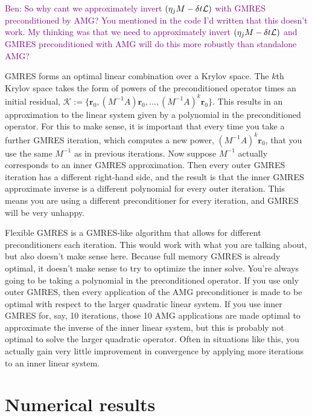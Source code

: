 \documentclass[review]{siamart}
\newcommand{\tcp}{\textcolor{purple}}
\begin{document}
\tcp{Ben: So why cant we approximately invert $(\eta_j M - \delta t {\cal L})$ with GMRES preconditioned by AMG? You mentioned in the code I'd written that this doesn't work. My thinking was that we need to approximately invert $(\eta_j M - \delta t {\cal L})$ and GMRES preconditioned with AMG will do this more robustly than standalone AMG?}
{\color{blue}
GMRES forms an optimal linear combination over a Krylov space. The $k$th Krylov space takes the form of powers
of the preconditioned operator times an initial residual, $\mathcal{K} := \{\mathbf{r}_0, (M^{-1}A)\mathbf{r}_0, 
..., (M^{-1}A)^k\mathbf{r}_0\}$. This results in an approximation to the linear system given by a polynomial
in the preconditioned operator. For this to make sense, it is important that every time you take a further
GMRES iteration, which computes a new power, $(M^{-1}A)^k\mathbf{r}_0$, that you use the same $M^{-1}$ as in
previous iterations. Now suppose $M^{-1}$ actually corresponds to an inner GMRES approximation. Then every
outer GMRES iteration has a different right-hand side, and the result is that the inner GMRES approximate 
inverse is a different polynomial for every outer iteration. This means you are using a different preconditioner
for every iteration, and GMRES will be very unhappy.

Flexible GMRES is a GMRES-like algorithm that allows for different preconditioners each iteration. This would
work with what you are talking about, but also doesn't make sense here. Because full memory GMRES is already
optimal, it doesn't make sense to try to optimize the inner solve. You're always going to be taking a polynomial
in the preconditioned operator. If you use only outer GMRES, then every application of the AMG preconditioner is 
made to be optimal with respect to the larger quadratic linear system. If you use inner GMRES for, say, 10
iterations,  those 10 AMG applications are made optimal to approximate the inverse of the inner linear system,
but this is probably not optimal to solve the larger quadratic operator. Often in situations like this, you
actually gain very little improvement in convergence by applying more iterations to an inner linear system.
}


\newpage
\section{Numerical results}
\end{document}
